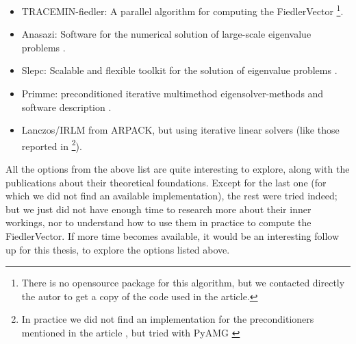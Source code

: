 \newpage
\begin{itemize}
  \item TRACEMIN-fiedler: A parallel algorithm for computing the
    \gls{FiedlerVector} \cite{trminfiedler} \footnote{There is no
      opensource package for this algorithm, but we contacted directly
    the autor to get a copy of the code used in the article.}.
  \item Anasazi: Software for the numerical solution of large-scale
    eigenvalue problems \cite{anasazi}.
  \item Slepc: Scalable and flexible toolkit for the solution of
    eigenvalue problems \cite{slepc}.
  \item Primme: preconditioned iterative multimethod
    eigensolver-methods and software description \cite{primme}.
  \item Lanczos/\gls{IRLM} from ARPACK, but using iterative linear solvers
    (like those reported in \cite{martinez16} \footnote{In practice we
  did not find an implementation for the preconditioners mentioned in
  the article \cite{martinez16}, but tried with PyAMG \cite{pyamg}}). 
\end{itemize}

All the options from the above list are quite interesting to explore, 
along with the publications about their theoretical
foundations. Except for the last one (for which we did not find an
available implementation), the rest were tried indeed; but we just did
not have enough time to research more about their inner workings, nor
to understand how to use them in practice to compute the
\gls{FiedlerVector}. If more time becomes available, it would be an interesting
follow up for this thesis, to explore the options listed above.


